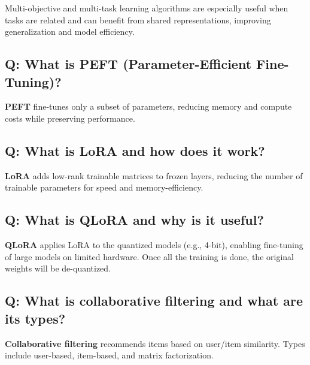 Multi-objective and multi-task learning algorithms are especially useful when tasks are related and can benefit from shared representations, improving generalization and model efficiency.

\subsection*{Q: What is PEFT (Parameter-Efficient Fine-Tuning)?}
\textbf{PEFT} fine-tunes only a subset of parameters, reducing memory and compute costs while preserving performance.

\subsection*{Q: What is LoRA and how does it work?}
\textbf{LoRA} adds low-rank trainable matrices to frozen layers, reducing the number of trainable parameters for speed and memory-efficiency.

\subsection*{Q: What is QLoRA and why is it useful?}
\textbf{QLoRA} applies LoRA to the quantized models (e.g., 4-bit), enabling fine-tuning of large models on limited hardware. Once all the training is done, the original weights will be de-quantized.

\subsection*{Q: What is collaborative filtering and what are its types?}
\textbf{Collaborative filtering} recommends items based on user/item similarity. Types include user-based, item-based, and matrix factorization.

